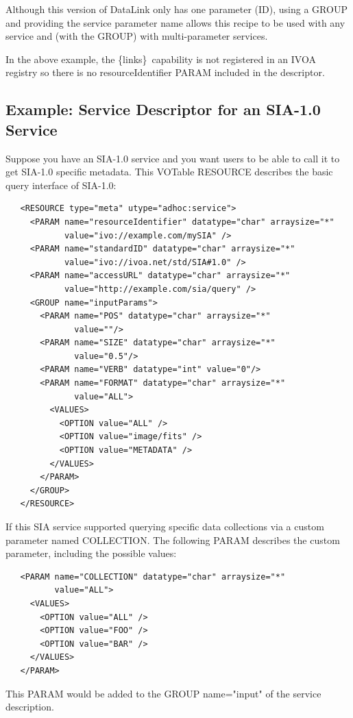 \documentclass[11pt,a4paper]{ivoa}
\newcommand{\blinks}{\{links\}}
\newcommand{\attval}[2]{#1={\allowbreak}{"}#2{"}}
\begin{document}
Although this version of DataLink only has one parameter (ID), using a
GROUP and providing the service parameter name allows this recipe to be
used with any service and (with the GROUP) with multi-parameter services.

In the above example, the \blinks\ capability is not registered in an
IVOA registry so there is no resourceIdentifier PARAM included in the
descriptor.


\subsection{Example: Service Descriptor for an SIA-1.0 Service}

Suppose you have an SIA-1.0 service and you want users to be able to
call it to get SIA-1.0 specific metadata. This VOTable RESOURCE describes
the basic query interface of SIA-1.0:
\begin{verbatim}
   <RESOURCE type="meta" utype="adhoc:service">
     <PARAM name="resourceIdentifier" datatype="char" arraysize="*"
            value="ivo://example.com/mySIA" />
     <PARAM name="standardID" datatype="char" arraysize="*"
            value="ivo://ivoa.net/std/SIA#1.0" />
     <PARAM name="accessURL" datatype="char" arraysize="*"
            value="http://example.com/sia/query" />
     <GROUP name="inputParams">
       <PARAM name="POS" datatype="char" arraysize="*"
              value=""/>
       <PARAM name="SIZE" datatype="char" arraysize="*"
              value="0.5"/>
       <PARAM name="VERB" datatype="int" value="0"/>
       <PARAM name="FORMAT" datatype="char" arraysize="*"
              value="ALL">
         <VALUES>
           <OPTION value="ALL" />
           <OPTION value="image/fits" />
           <OPTION value="METADATA" />
         </VALUES>
       </PARAM>
     </GROUP>
   </RESOURCE>
\end{verbatim}

If this SIA service supported querying specific data collections via
a custom parameter named COLLECTION. The following PARAM describes the
custom parameter, including the possible values:
\begin{verbatim}
   <PARAM name="COLLECTION" datatype="char" arraysize="*"
          value="ALL">
     <VALUES>
       <OPTION value="ALL" />
       <OPTION value="FOO" />
       <OPTION value="BAR" />
     </VALUES>
   </PARAM>
\end{verbatim}
This PARAM would be added to the GROUP \attval{name}{input} of the service
description.
\end{document}
